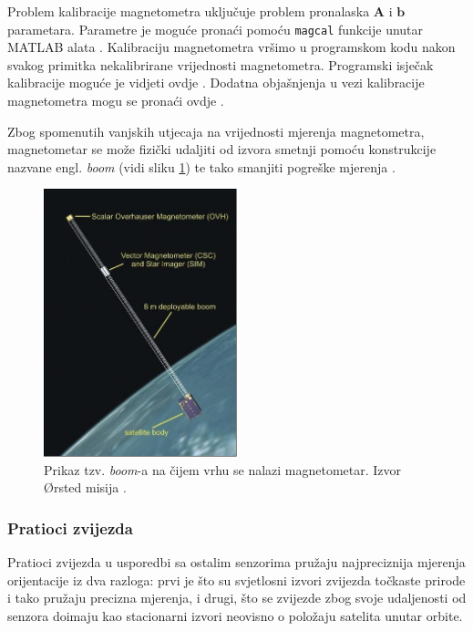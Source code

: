 \documentclass[times, utf8, diplomski, numeric]{templates/template}
\begin{document}
{{{{                Problem kalibracije magnetometra uključuje problem pronalaska $\boldsymbol{A}$ i $\boldsymbol{b}$ parametara. Parametre je moguće pronaći pomoću \texttt{magcal} funkcije unutar MATLAB alata \cite{magcal}. Kalibraciju magnetometra vršimo u programskom kodu nakon svakog primitka nekalibrirane vrijednosti magnetometra. Programski isječak kalibracije moguće je vidjeti ovdje \cite{kalibracijaMagKod}. Dodatna objašnjenja u vezi kalibracije magnetometra mogu se pronaći ovdje \cite{kalibracijaMatlabStranica}.

                Zbog spomenutih vanjskih utjecaja na vrijednosti mjerenja magnetometra, magnetometar se može fizički udaljiti od izvora smetnji pomoću konstrukcije nazvane engl. \emph{boom} (vidi sliku \ref{fig:boom}) te tako smanjiti pogreške mjerenja \cite{adcsKnjiga}. 

                \begin{figure}[htb]
                \centering
                \includegraphics[width=0.5\textwidth]{images/boom.jpg}
                \caption{Prikaz tzv. \emph{boom}-a na čijem vrhu se nalazi magnetometar. Izvor Ørsted misija \cite{boomCite}.}
                \label{fig:boom}
                \end{figure}
            }

            \subsubsection{Pratioci zvijezda }{
                Pratioci zvijezda u usporedbi sa ostalim senzorima pružaju najpreciznija mjerenja orijentacije iz dva razloga: prvi je što su svjetlosni izvori zvijezda točkaste prirode i tako pružaju precizna mjerenja, i drugi, što se zvijezde zbog svoje udaljenosti od senzora doimaju kao stacionarni izvori neovisno o položaju satelita unutar orbite.

}}}}
\end{document}
